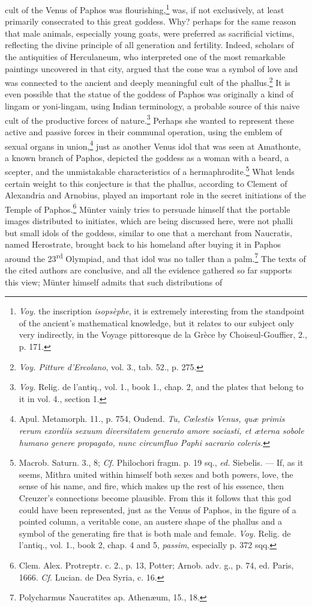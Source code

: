 \documentclass[a4paper, 11pt, oneside, polutonikogreek, english]{article}
\begin{document}
cult of the Venus of Paphos was flourishing,\footnote{\emph{Voy.} the inscription \emph{isopsèphe}, it is extremely interesting from the standpoint of the ancient's mathematical knowledge, but it relates to our subject only very indirectly, in the Voyage pittoresque de la Grèce by Choiseul-Gouffier, 2., p. 171.} was, if not exclusively, at least primarily consecrated to this great goddess. Why? perhaps for the same reason that male animals, especially young goats, were preferred as sacrificial victims, reflecting the divine principle of all generation and fertility. Indeed, scholars of the antiquities of Herculaneum, who interpreted one of the most remarkable paintings uncovered in that city, argued that the cone was a symbol of love and was connected to the ancient and deeply meaningful cult of the phallus.\footnote{\emph{Voy. Pitture d'Ercolano}, vol. 3., tab. 52., p. 275.} It is even possible that the statue of the goddess of Paphos was originally a kind of lingam or yoni-lingam, using Indian terminology, a probable source of this naive cult of the productive forces of nature.\footnote{\emph{Voy.} Relig. de l'antiq., vol. 1., book 1., chap. 2, and the plates that belong to it in vol. 4., section 1.} Perhaps she wanted to represent these active and passive forces in their communal operation, using the emblem of sexual organs in union,\footnote{Apul. Metamorph. 11., p. 754, Oudend. \emph{Tu, Cœlestis Venus, quæ primis rerum exordiis sexuum diversitatem generato amore sociasti, et æterna sobole humano genere propagato, nunc circumfluo Paphi sacrario coleris.}} just as another Venus idol that was seen at Amathonte, a known branch of Paphos, depicted the goddess as a woman with a beard, a scepter, and the unmistakable characteristics of a hermaphrodite.\footnote{Macrob. Saturn. 3., 8; \emph{Cf.} Philochori fragm. p. 19 sq., \emph{ed.} Siebelis. --- If, as it seems, Mithra united within himself both sexes and both powers, love, the sense of his name, and fire, which makes up the rest of his essence, then Creuzer's connections become plausible. From this it follows that this god could have been represented, just as the Venus of Paphos, in the figure of a pointed column, a veritable cone, an austere shape of the phallus and a symbol of the generating fire that is both male and female. \emph{Voy.} Relig. de l'antiq., vol. 1., book 2, chap. 4 and 5, \emph{passim}, especially p. 372 sqq.} What lends certain weight to this conjecture is that the phallus, according to Clement of Alexandria and Arnobius, played an important role in the secret initiations of the Temple of Paphos.\footnote{Clem. Alex. Protreptr. c. 2., p. 13, Potter; Arnob. adv. g., p. 74, ed. Paris, 1666. \emph{Cf.} Lucian. de Dea Syria, c. 16.} Münter vainly tries to persuade himself that the portable images distributed to initiates, which are being discussed here, were not phalli but small idols of the goddess, similar to one that a merchant from Naucratis, named Herostrate, brought back to his homeland after buying it in Paphos around the 23\textsuperscript{rd} Olympiad, and that idol was no taller than a palm.\footnote{Polycharmus Naucratites ap. Athenæum, 15., 18.} The texts of the cited authors are conclusive, and all the evidence gathered so far supports this view; Münter himself admits that such distributions of 
\end{document}
